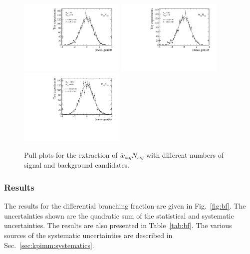 \begin{figure}[!tb]
 \centering
 \includegraphics[width=0.45\textwidth]{figs/kpimm/bf/n_prime_low_yield.pdf}
 \includegraphics[width=0.45\textwidth]{figs/kpimm/bf/n_prime_med_yield.pdf}
 \includegraphics[width=0.45\textwidth]{figs/kpimm/bf/n_prime_high_yield.pdf}
 \caption{Pull plots for the extraction of $\overline{w}_{sig}N_{sig}$ with different numbers of signal and background candidates.}
 \label{fig:bf:pulls}
\end{figure}

\subsubsection{Results}

The results for the differential branching fraction are given in Fig.~\ref{fig:bf}.  The uncertainties shown are the quadratic sum of the statistical and systematic uncertainties.  The results are also presented in Table~\ref{tab:bf}.  The various sources of the systematic uncertainties are described in Sec.~\ref{sec:kpimm:systematics}.
 
